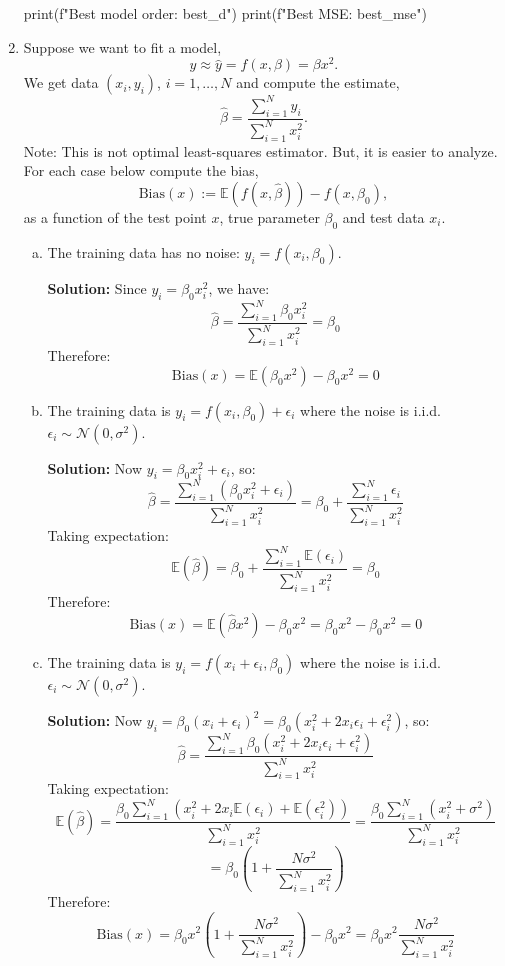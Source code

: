 \documentclass[11pt]{article}
\def\Exp{\mathbb{E}}
\newcommand{\yhat}{\widehat{y}}
\begin{document}
\begin{enumerate}
\begin{python}
print(f"Best model order: {best_d}")
print(f"Best MSE: {best_mse}")
\end{python}

\item Suppose we want to fit a model,
\[
    y \approx \yhat = f(x,\beta) = \beta x^2.
\]
We get data $(x_i,y_i)$, $i=1,\ldots,N$ and compute the estimate, 
\[
    \widehat{\beta} = \frac{\sum_{i=1}^N y_i}{ \sum_{i=1}^N x_i^2}.
\]
Note:  This is not optimal least-squares estimator.  But, it is easier to analyze.
For each case below compute the bias, 
\[
    \mathrm{Bias}(x) := \Exp(f(x,\widehat{\beta})) -  f(x,\beta_0),
\]
as a function of the test point $x$, true parameter $\beta_0$ and test data $x_i$.
\begin{enumerate}[(a)]
\item The training data has no noise: $y_i = f(x_i,\beta_0)$.

\textbf{Solution:}
Since $y_i = \beta_0 x_i^2$, we have:
\[
\widehat{\beta} = \frac{\sum_{i=1}^N \beta_0 x_i^2}{\sum_{i=1}^N x_i^2} = \beta_0
\]
Therefore:
\[
\mathrm{Bias}(x) = \Exp(\beta_0 x^2) - \beta_0 x^2 = 0
\]

\item The training data is $y_i = f(x_i,\beta_0) + \epsilon_i$ where 
the noise is i.i.d.\  $\epsilon_i \sim {\mathcal N}(0,\sigma^2)$.

\textbf{Solution:}
Now $y_i = \beta_0 x_i^2 + \epsilon_i$, so:
\[
\widehat{\beta} = \frac{\sum_{i=1}^N (\beta_0 x_i^2 + \epsilon_i)}{\sum_{i=1}^N x_i^2} = \beta_0 + \frac{\sum_{i=1}^N \epsilon_i}{\sum_{i=1}^N x_i^2}
\]
Taking expectation:
\[
\Exp(\widehat{\beta}) = \beta_0 + \frac{\sum_{i=1}^N \Exp(\epsilon_i)}{\sum_{i=1}^N x_i^2} = \beta_0
\]
Therefore:
\[
\mathrm{Bias}(x) = \Exp(\widehat{\beta} x^2) - \beta_0 x^2 = \beta_0 x^2 - \beta_0 x^2 = 0
\]

\item The training data is $y_i = f(x_i+\epsilon_i,\beta_0)$ where
the noise is i.i.d.\ $\epsilon_i \sim {\mathcal N}(0,\sigma^2)$.

\textbf{Solution:}
Now $y_i = \beta_0 (x_i + \epsilon_i)^2 = \beta_0(x_i^2 + 2x_i\epsilon_i + \epsilon_i^2)$, so:
\[
\widehat{\beta} = \frac{\sum_{i=1}^N \beta_0(x_i^2 + 2x_i\epsilon_i + \epsilon_i^2)}{\sum_{i=1}^N x_i^2}
\]
Taking expectation:
\[
\Exp(\widehat{\beta}) = \frac{\beta_0 \sum_{i=1}^N (x_i^2 + 2x_i\Exp(\epsilon_i) + \Exp(\epsilon_i^2))}{\sum_{i=1}^N x_i^2} = \frac{\beta_0 \sum_{i=1}^N (x_i^2 + \sigma^2)}{\sum_{i=1}^N x_i^2}
\]
\[
= \beta_0 \left(1 + \frac{N\sigma^2}{\sum_{i=1}^N x_i^2}\right)
\]
Therefore:
\[
\mathrm{Bias}(x) = \beta_0 x^2 \left(1 + \frac{N\sigma^2}{\sum_{i=1}^N x_i^2}\right) - \beta_0 x^2 = \beta_0 x^2 \frac{N\sigma^2}{\sum_{i=1}^N x_i^2}
\]


\end{enumerate}
\end{enumerate}
\end{document}
